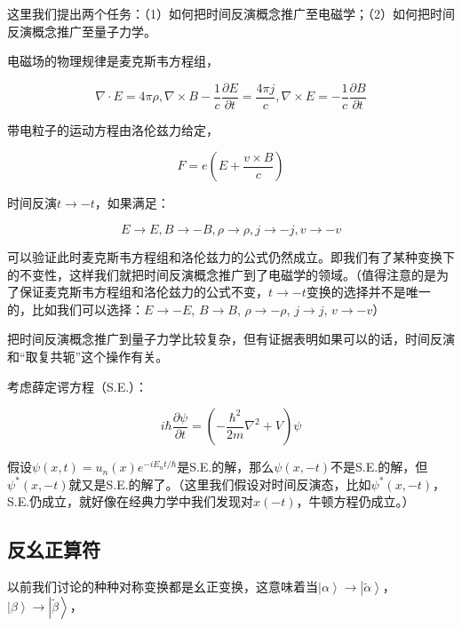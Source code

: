 这里我们提出两个任务：（1）如何把时间反演概念推广至电磁学；（2）如何把时间反演概念推广至量子力学。

电磁场的物理规律是麦克斯韦方程组，

\begin{equation}
\nabla \cdot E = 4 \pi \rho, \nabla \times B - \frac{1}{c} \frac{\partial E}{\partial t} = \frac{4 \pi j}{c}, \nabla \times E = - \frac{1}{c} \frac{\partial B}{\partial t}
\end{equation}

带电粒子的运动方程由洛伦兹力给定，

\begin{equation}
F = e \left( E + \frac{v \times B}{c}   \right)
\end{equation}

时间反演$t \to -t$，如果满足：

\begin{equation}
E \to E, B \to -B, \rho \to \rho, j \to -j, v \to -v
\end{equation}

可以验证此时麦克斯韦方程组和洛伦兹力的公式仍然成立。即我们有了某种变换下的不变性，这样我们就把时间反演概念推广到了电磁学的领域。（值得注意的是为了保证麦克斯韦方程组和洛伦兹力的公式不变，$t \to -t$变换的选择并不是唯一的，比如我们可以选择：$E \to -E$, $B \to B$, $\rho \to - \rho$, $j \to j$, $v \to -v$）

把时间反演概念推广到量子力学比较复杂，但有证据表明如果可以的话，时间反演和“取复共轭”这个操作有关。

考虑薛定谔方程（S.E.）：

\begin{equation}
i \hbar \frac{\partial \psi}{\partial t} = \left( - \frac{\hbar^2}{2m}\nabla^2 + V \right) \psi
\end{equation}

假设$\psi(x,t) = u_n (x) e^{- i E_n t / \hbar}$是S.E.的解，那么$\psi(x, -t)$不是S.E.的解，但$\psi^* (x, -t)$就又是S.E.的解了。（这里我们假设对时间反演态，比如$\psi^* (x, -t)$，S.E.仍成立，就好像在经典力学中我们发现对$x(-t)$，牛顿方程仍成立。）

\subsection{反幺正算符}

以前我们讨论的种种对称变换都是幺正变换，这意味着当$\left| \alpha \right\rangle \to \left| \tilde{ \alpha }  \right\rangle$，$\left| \beta \right\rangle \to \left| \tilde{ \beta }  \right\rangle$，


